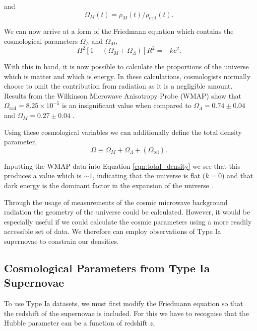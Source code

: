 \documentclass[twocolumn]{revtex4}
\begin{document}
and 
\begin{equation}
\Omega_{M}(t) = \rho_{M}(t) / \rho_{\text{crit}}(t).
\label{eqn:omg_m}
\end{equation}

We can now arrive at a form of the Friedmann equation which contains the cosmological parameters $\Omega_{\Lambda}$ and $\Omega_{M}$,
\begin{equation}
H^2 [1-(\Omega_{M}+\Omega_{\Lambda})]R^2 = -kc^2.
\end{equation}

With this in hand, it is now possible to calculate the proportions of the universe which is matter and which is energy. In these calculations, cosmologists normally choose to omit the contribution from radiation as it is a negligible amount. Results from the Wilkinson Microwave Anisotropy Probe (WMAP) show that $\Omega_{\text{rad}}=8.25 \times 10^{-5}$ is an insignificant value when compared to $\Omega_{\Lambda}=0.74 \pm 0.04$ and $\Omega_{M} = 0.27 \pm 0.04$ \cite{mod_ast}. 

Using these cosmological variables we can additionally define the total density parameter,
\begin{equation}
\Omega \equiv \Omega_{M} + \Omega_{\Lambda} + (\Omega_{\text{rel}}).
\label{eqn:total_density}
\end{equation}

Inputting the WMAP data into Equation \ref{eqn:total_density} we see that this produces a value which is $\sim 1$, indicating that the universe is flat ($k=0$) and that dark energy is the dominant factor in the expansion of the universe \cite{mod_ast}.

Through the usage of measurements of the cosmic microwave background radiation the geometry of the universe could be calculated. However, it would be especially useful if we could calculate the cosmic parameters using a more readily accessible set of data. We therefore can employ observations of Type Ia supernovae to constrain our densities.  

\vspace{-3ex}
\subsection{Cosmological Parameters from Type Ia Supernovae}
\vspace{-2ex}
To use Type Ia datasets, we must first modify the Friedmann equation so that the redshift of the supernovae is included. For this we have to recognise that the Hubble parameter can be a function of redshift $z$, 
\end{document}
